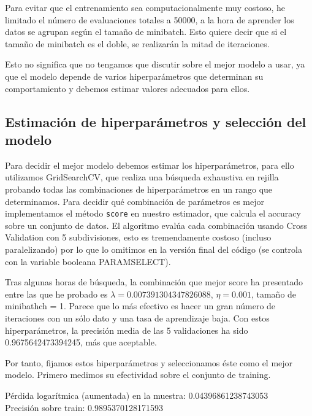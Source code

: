 \documentclass[a4]{article}
\begin{document}
Para evitar que el entrenamiento sea computacionalmente muy costoso,
he limitado el número de evaluaciones totales a 50000, a la hora de
aprender los datos se agrupan según el tamaño de minibatch. Esto
quiere decir que si el tamaño de minibatch es el doble, se realizarán
la mitad de iteraciones.

Esto no significa que no tengamos que discutir sobre el mejor modelo a
usar, ya que el modelo depende de varios hiperparámetros que
determinan su comportamiento y debemos estimar valores adecuados para
ellos.

\subsection{Estimación de hiperparámetros y selección del modelo}

Para decidir el mejor modelo debemos estimar los hiperparámetros, para
ello utilizamos GridSearchCV, que realiza una búsqueda exhaustiva en
rejilla probando todas las combinaciones de hiperparámetros en un
rango que determinamos. Para decidir qué combinación de parámetros es
mejor implementamos el método \texttt{score} en nuestro estimador, que
calcula el accuracy sobre un conjunto de datos. El algoritmo evalúa
cada combinación usando Cross Validation con 5 subdivisiones, esto es
tremendamente costoso (incluso paralelizando) por lo que lo omitimos
en la versión final del código (se controla con la variable booleana
PARAMSELECT).

Tras algunas horas de búsqueda, la combinación que mejor score ha
presentado entre las que he probado es $\lambda=0.007391304347826088$,
$\eta=0.001$, tamaño de minibathch = 1. Parece que lo más efectivo es
hacer un gran número de iteraciones con un sólo dato y una tasa de
aprendizaje baja. Con estos hiperparámetros, la precisión media de las
5 validaciones ha sido 0.9675642473394245, más que aceptable.

Por tanto, fijamos estos hiperparámetros y seleccionamos éste como el
mejor modelo. Primero medimos su efectividad sobre el conjunto de
training.

Pérdida logarítmica (aumentada) en la muestra: 0.04396861238743053 \\
Precisión sobre train: 0.9895370128171593
\end{document}
